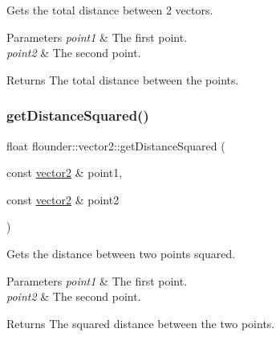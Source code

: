 Gets the total distance between 2 vectors. 


\begin{DoxyParams}{Parameters}
{\em point1} & The first point. \\
\hline
{\em point2} & The second point. \\
\hline
\end{DoxyParams}
\begin{DoxyReturn}{Returns}
The total distance between the points. 
\end{DoxyReturn}
\mbox{\label{classflounder_1_1vector2_a985bee9ad411c7b2d21a53dc42c05da4}} 
\subsubsection{\texorpdfstring{get\+Distance\+Squared()}{getDistanceSquared()}}
{\footnotesize\ttfamily float flounder\+::vector2\+::get\+Distance\+Squared (\begin{DoxyParamCaption}\item[{const \hyperlink{classflounder_1_1vector2}{vector2} \&}]{point1,  }\item[{const \hyperlink{classflounder_1_1vector2}{vector2} \&}]{point2 }\end{DoxyParamCaption})\hspace{0.3cm}{\ttfamily [static]}}



Gets the distance between two points squared. 


\begin{DoxyParams}{Parameters}
{\em point1} & The first point. \\
\hline
{\em point2} & The second point. \\
\hline
\end{DoxyParams}
\begin{DoxyReturn}{Returns}
The squared distance between the two points. 
\end{DoxyReturn}
\mbox{\label{classflounder_1_1vector2_ad1e3c47f5e177a7de2427663f6c66008}} 
